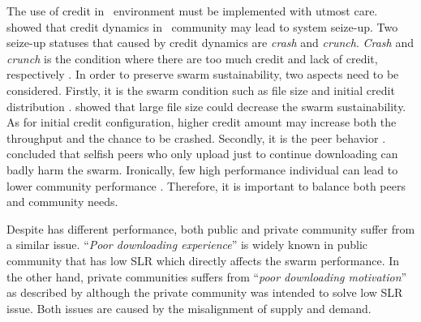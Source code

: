 
The use of credit in \bt~environment must be implemented with utmost care. \citeauthor{2010:crashsustain:rahman} showed that credit dynamics in \bt~community may lead to system seize-up. Two seize-up statuses that caused by credit dynamics are \textit{crash} and \textit{crunch}. \textit{Crash} and \textit{crunch} is the condition where there are too much credit and lack of credit, respectively \cite{2010:crashsustain:rahman, 2015:sustainabilitypt:vinko}. In order to preserve swarm sustainability, two aspects need to be considered. Firstly, it is the swarm condition such as file size and initial credit distribution \cite{2015:sustainabilitypt:vinko}. \citeauthor{2015:sustainabilitypt:vinko} showed that large file size could decrease the swarm sustainability. As for initial credit configuration, higher credit amount may increase both the throughput and the chance to be crashed. Secondly, it is the peer behavior \cite{2010:crashsustain:rahman}. \citeauthor{2010:crashsustain:rahman} concluded that selfish peers who only upload just to continue downloading can badly harm the swarm. Ironically, few high performance individual can lead to lower community performance \cite{2015:sustainabilitypt:vinko}. Therefore, it is important to balance both peers and community needs.

Despite has different performance, both public and private community suffer from a similar issue. ``\textit{Poor downloading experience}'' is widely known in public community that has low SLR which directly affects the swarm performance. In the other hand, private communities suffers from ``\textit{poor downloading motivation}'' as described by \citeauthor{2014:sustainabilitytorrent:chen}\cite{2014:sustainabilitytorrent:chen} although the private community was intended to solve low SLR issue. Both issues are caused by the misalignment of supply and demand.

